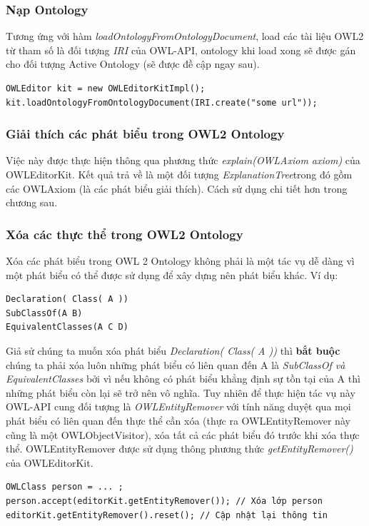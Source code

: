 {\subsubsection{Nạp Ontology}
Tương ứng với hàm \textit{loadOntologyFromOntologyDocument}, load các tài liệu OWL2 từ tham số là đối tượng \textit{IRI} của OWL-API, ontology khi load xong sẽ được gán cho đối tượng Active Ontology (sẽ được đề cập ngay sau).
\begin{verbatim}
OWLEditor kit = new OWLEditorKitImpl();
kit.loadOntologyFromOntologyDocument(IRI.create("some url"));
\end{verbatim}
\subsubsection{Giải thích các phát biểu trong OWL2 Ontology}
Việc này được thực hiện thông qua phương thức \textit{explain(OWLAxiom axiom)} của OWLEditorKit. Kết quả trả về là một đối tượng \textit{ExplanationTree}trong đó gồm các OWLAxiom (là các phát biểu giải thích). Cách sử dụng chi tiết hơn trong chương sau.

\subsubsection{Xóa các thực thể trong OWL2 Ontology}
Xóa các phát biểu trong OWL 2 Ontology không phải là một tác vụ dễ dàng vì một phát biểu có thể được sử dụng để xây dựng nên phát biểu khác. Ví dụ:
\begin{verbatim}
Declaration( Class( A ))
SubClassOf(A B)
EquivalentClasses(A C D)
\end{verbatim}
Giả sử chúng ta muốn xóa phát biểu \textit{Declaration( Class( A ))} thì \textbf{bắt buộc} chúng ta phải xóa luôn những phát biểu có liên quan đến A là \textit{SubClassOf và EquivalentClasses} bởi vì nếu không có phát biểu khẳng định sự tồn tại của A thì những phát biểu còn lại sẽ trở nên vô nghĩa. Tuy nhiên để thực hiện tác vụ này OWL-API cung đối tượng là \textit{OWLEntityRemover} với tính năng duyệt qua mọi phát biểu có liên quan đến thực thể cần xóa (thực ra OWLEntityRemover này cũng là một OWLObjectVisitor), xóa tất cả các phát biểu đó trước khi xóa thực thể. OWLEntityRemover được sử dụng thông phương thức \textit{getEntityRemover()} của OWLEditorKit. 
\begin{verbatim}
OWLClass person = ... ;
person.accept(editorKit.getEntityRemover()); // Xóa lớp person 
editorKit.getEntityRemover().reset(); // Cập nhật lại thông tin
\end{verbatim}

}
